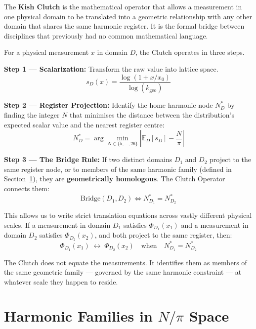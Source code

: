 \documentclass[12pt,oneside]{book}
\begin{document}
The \textbf{Kish Clutch} is the mathematical operator that allows a measurement
in one physical domain to be translated into a geometric relationship with any other
domain that shares the same harmonic register. It is the formal bridge between
disciplines that previously had no common mathematical language.

For a physical measurement $x$ in domain $D$, the Clutch operates in three steps.

\textbf{Step 1 — Scalarization:} Transform the raw value into lattice space.
\begin{equation}
s_D(x) = \frac{\log(1 + x/x_0)}{\log(k_\text{geo})}
\label{eq:scalarization}
\end{equation}

\textbf{Step 2 — Register Projection:} Identify the home harmonic node $N^*_D$
by finding the integer $N$ that minimises the distance between the distribution's
expected scalar value and the nearest register centre:
\begin{equation}
N^*_D = \arg\min_{N \in \{5,\ldots,26\}} \left| \mathbb{E}_D[s_D] - \frac{N}{\pi} \right|
\label{eq:register_projection}
\end{equation}

\textbf{Step 3 — The Bridge Rule:} If two distinct domains $D_1$ and $D_2$ project
to the same register node, or to members of the same harmonic family (defined in
Section~\ref{sec:families}), they are \textbf{geometrically homologous}. The Clutch
Operator connects them:
\begin{equation}
\text{Bridge}(D_1, D_2) \iff N^*_{D_1} = N^*_{D_2}
\label{eq:bridge_rule}
\end{equation}

This allows us to write strict translation equations across vastly different physical
scales. If a measurement in domain $D_1$ satisfies $\Phi_{D_1}(x_1)$ and a measurement
in domain $D_2$ satisfies $\Phi_{D_2}(x_2)$, and both project to the same register, then:
\begin{equation}
\Phi_{D_1}(x_1) \;\longleftrightarrow\; \Phi_{D_2}(x_2) \quad\text{when}\quad
N^*_{D_1} = N^*_{D_2}
\end{equation}

The Clutch does not equate the measurements. It identifies them as members of the same
geometric family — governed by the same harmonic constraint — at whatever scale they
happen to reside.

\section{Harmonic Families in $N/\pi$ Space}
\label{sec:families}
\end{document}
